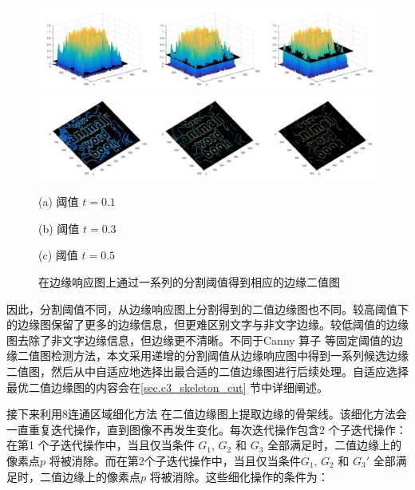         \begin{figure}[!h]
        \centering
        \includegraphics[width=\textwidth]{./figures/c3_edge_response.jpg}
        \includegraphics[width=\textwidth]{./figures/c3_edge_map.jpg}
        \begin{minipage}[t]{0.32\linewidth}
        \centerline{ \small (a) 阈值 $t = 0.1$}
        \end{minipage}
        \begin{minipage}[t]{0.32\linewidth}
        \centerline{ \small (b) 阈值 $t = 0.3$}
        \end{minipage}
        \begin{minipage}[t]{0.32\linewidth}
        \centerline{ \small (c) 阈值 $t = 0.5$}
        \end{minipage}
        \caption{在边缘响应图上通过一系列的分割阈值得到相应的边缘二值图}
        \label{fig.c3_response_to_map}
        \end{figure}

        因此，分割阈值不同，从边缘响应图上分割得到的二值边缘图也不同。较高阈值下的边缘图保留了更多的边缘信息，但更难区别文字与非文字边缘。较低阈值的边缘图去除了非文字边缘信息，但边缘更不清晰。不同于Canny 算子\cite{Ding2001On} 等固定阈值的边缘二值图检测方法，本文采用递增的分割阈值从边缘响应图中得到一系列候选边缘二值图，然后从中自适应地选择出最合适的二值边缘图进行后续处理。自适应选择最优二值边缘图的内容会在\ref{sec.c3_skeleton_cut} 节中详细阐述。

        接下来利用8连通区域细化方法\cite{Lam2002Thinning} 在二值边缘图上提取边缘的骨架线。该细化方法会一直重复迭代操作，直到图像不再发生变化。每次迭代操作包含2 个子迭代操作：在第1 个子迭代操作中，当且仅当条件 $G_1$, $G_2$ 和 $G_3$ 全部满足时，二值边缘上的像素点$p$ 将被消除。而在第2个子迭代操作中，当且仅当条件$G_1$, $G_2$ 和 $G_3$$'$ 全部满足时，二值边缘上的像素点$p$ 将被消除。这些细化操作的条件为：

